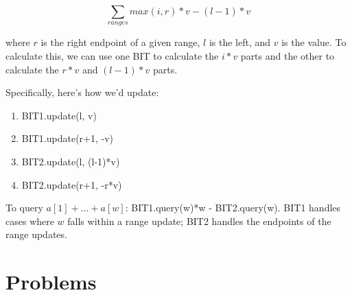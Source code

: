 \documentclass{article}
\begin{document}
            $$ \sum_{ranges}{max(i, r)*v-(l-1)*v} $$
            
            where $r$ is the right endpoint of a given range, $l$ is the left, and $v$ is the value.
            To calculate this, we can use one BIT to calculate the $i*v$ parts and the other to calculate the $r*v$ and $(l-1)*v$ parts.
            
            Specifically, here's how we'd update:
            \begin{enumerate}
                \item BIT1.update(l, v)
                \item BIT1.update(r+1, -v)
                \item BIT2.update(l, (l-1)*v)
                \item BIT2.update(r+1, -r*v)
            \end{enumerate}
            
            To query $a[1]+...+a[w]$: BIT1.query(w)*w - BIT2.query(w).
            BIT1 handles cases where $w$ falls within a range update; BIT2 handles the endpoints of the range updates.
            
\section{Problems}
\end{document}
